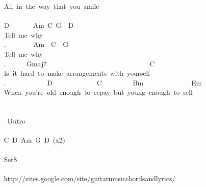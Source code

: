 {All\ in\ the\ way\ that\ you\ smile\\
\\
D\ \ \ \ \ \ \ Am\ C\ G\ \ D\\
Tell\ me\ why\ \ \\
.\ \ \ \ \ \ \ \ Am\ \ C\ \ G\\
Tell\ me\ why\ \ \\
.\ \ \ \ \ \ Gmaj7\ \ \ \ \ \ \ \ \ \ \ \ \ \ \ \ \ \ \ \ \ \ \ \ \ \ \ \ \ \ C\\
Is\ it\ hard\ to\ make\ arrangements\ with\ yourself\\
.\ \ \ \ \ \ \ \ \ \ \ \ D\ \ \ \ \ \ \ \ \ \ \ \ \ C\ \ \ \ \ \ \ \ \ Bm\ \ \ \ \ \ \ \ \ \ \ \ \ \ Em\ \ \\
When\ you're\ old\ enough\ to\ repay\ but\ young\ enough\ to\ sell\\
\\
\\
\lbrack\ Outro\rbrack\\
\\
C\ D\ Am\ G\ D\ (x2)\\
\\
Set8\\
\\
http://sites.google.com/site/guitarmusicchordsandlyrics/}
